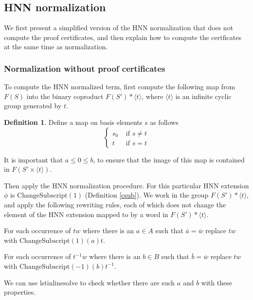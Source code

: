 \documentclass[12pt]{article} %
\theoremstyle{definition}
\theoremstyle{definition}
\theoremstyle{definition}
\theoremstyle{definition}
\newtheorem{defn}[thm]{Definition}
\begin{document}
\subsection{HNN normalization}\label{HNNnorm}

We first present a simplified version of the HNN normalization that does not compute
the proof certificates, and then explain how to compute the certficates at the
same time as normalization.

\subsubsection{Normalization without proof certificates}\label{HNNnormnoproof}

To compute the HNN normalized term,
first compute the following map from $F(S)$ into the binary
coproduct $F(S') \ast \langle t \rangle$, where $\langle t \rangle$ is an infinite
cyclic group generated by $t$.

\begin{defn}\label{tocoprod}
  Define a map on basis elements $s$ as follows
  \begin{equation}
    \begin{cases}
      s_0 & \text{ if } s \ne t \\
      t & \text{ if } s = t
    \end{cases}
  \end{equation}
\end{defn}

It is important that $a \le 0 \le b$, to ensure that the image
of this map is contained in $F(S' \times \langle t \rangle)$.

Then apply the HNN normalization procedure. For this particular HNN extension
$\phi$ is $\text{ChangeSubscript}(1)$ (Definition \ref{csub}).
We work in the group $F(S') \ast \langle t \rangle$, and apply the following
rewriting rules, each of which does not change the element of the HNN extension
mapped to by a word in $F(S') \ast \langle t \rangle$.

For each occurrence of $tw$ where there is an $a \in A$ such that
$\overline{a} = \overline{w}$ replace $tw$ with $\text{ChangeSubscript}(1)(a)t$.

For each occurrence of $t^{-1}w$ where there is an $b \in B$ such that
$\overline{b} = \overline{w}$ replace $tw$ with $\text{ChangeSubscript}(-1)(b)t^{-1}$.

We can use lstinline{solve} to check whether there are such $a$ and $b$ with
these properties.
\end{document}
